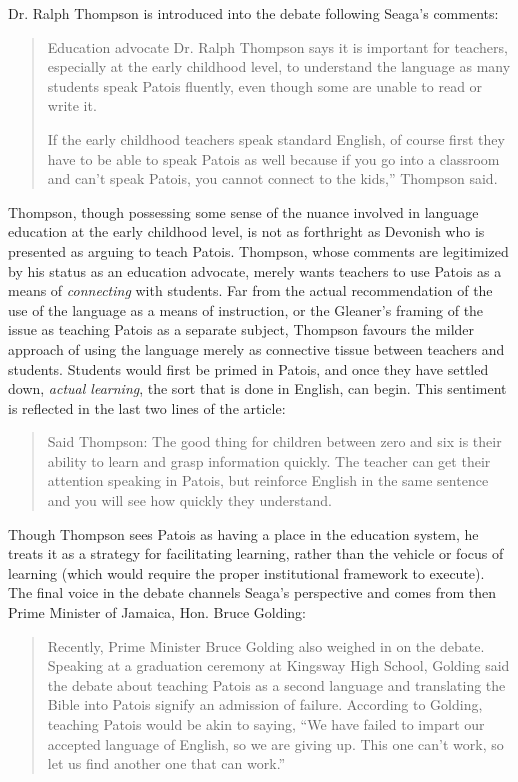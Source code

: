 \documentclass[output=paper,colorlinks,citecolor=brown]{langscibook}
\begin{document}
Dr. Ralph Thompson is introduced into the debate following Seaga’s comments: 

\begin{quote}
    Education advocate Dr. Ralph Thompson says it is important for teachers, especially at the early childhood level, to understand the language as many students speak Patois fluently, even though some are unable to read or write it.
    
    If the early childhood teachers speak standard English, of course first they have to be able to speak Patois as well because if you go into a classroom and can’t speak Patois, you cannot connect to the kids,” Thompson said.
\end{quote}
 

Thompson, though possessing some sense of the nuance involved in language education at the early childhood level, is not as forthright as Devonish who is presented as arguing to teach Patois. Thompson, whose comments are legitimized by his status as an education advocate, merely wants teachers to use Patois as a means of \emph{connecting} with students. Far from the actual recommendation of the use of the language as a means of instruction, or the Gleaner’s framing of the issue as teaching Patois as a separate subject, Thompson favours the milder approach of using the language merely as connective tissue between teachers and students. Students would first be primed in Patois, and once they have settled down, \emph{actual learning}, the sort that is done in English, can begin. This sentiment is reflected in the last two lines of the article: 

\begin{quote}
    Said Thompson: The good thing for children between zero and six is their ability to learn and grasp information quickly. The teacher can get their attention speaking in Patois, but reinforce English in the same sentence and you will see how quickly they understand.
\end{quote}

Though Thompson sees Patois as having a place in the education system, he treats it as a strategy for facilitating learning, rather than the vehicle or focus of learning (which would require the proper institutional framework to execute). The final voice in the debate channels Seaga’s perspective and comes from then Prime Minister of Jamaica, Hon. Bruce Golding: 

\begin{quote}\sloppy
    Recently, Prime Minister Bruce Golding also weighed in on the debate. Speaking at a graduation ceremony at Kingsway High School, Golding said the debate about teaching Patois as a second language and translating the Bible into Patois signify an admission of failure. According to Golding, teaching Patois would be akin to saying, “We have failed to impart our accepted language of English, so we are giving up. This one can't work, so let us find another one that can work.”
\end{quote}
\end{document}
